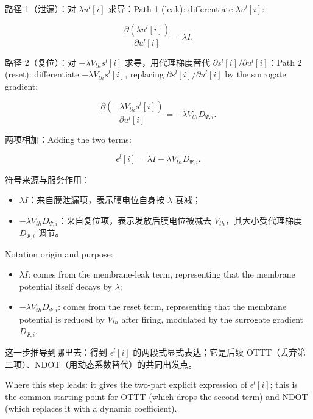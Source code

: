 \documentclass[journal,12pt,onecolumn]{IEEEtran}
\begin{document}
路径 1（泄漏）：对 $\lambda u^l[i]$ 求导：\quad Path 1 (leak): differentiate $\lambda u^l[i]$:

\begin{equation}
\frac{\partial (\lambda u^l[i])}{\partial u^l[i]} = \lambda I.
\end{equation}

路径 2（复位）：对 $-\lambda V_{th} s^l[i]$ 求导，用代理梯度替代 $\partial s^l[i]/\partial u^l[i]$：\quad Path 2 (reset): differentiate $-\lambda V_{th} s^l[i]$, replacing $\partial s^l[i]/\partial u^l[i]$ by the surrogate gradient:

\begin{equation}
\frac{\partial (-\lambda V_{th} s^l[i])}{\partial u^l[i]} = -\lambda V_{th} D_{\Psi,i}.
\end{equation}

两项相加：Adding the two terms:

\begin{equation}
\epsilon^l[i] = \lambda I - \lambda V_{th} D_{\Psi,i}.
\end{equation}

符号来源与服务作用：
\begin{itemize}[leftmargin=1.5em,itemsep=2pt]
\item $\lambda I$：来自膜泄漏项，表示膜电位自身按 $\lambda$ 衰减；
\item $-\lambda V_{th} D_{\Psi,i}$：来自复位项，表示发放后膜电位被减去 $V_{th}$，其大小受代理梯度 $D_{\Psi,i}$ 调节。
\end{itemize}

Notation origin and purpose:
\begin{itemize}[leftmargin=1.5em,itemsep=2pt]
\item $\lambda I$: comes from the membrane-leak term, representing that the membrane potential itself decays by $\lambda$;
\item $-\lambda V_{th} D_{\Psi,i}$: comes from the reset term, representing that the membrane potential is reduced by $V_{th}$ after firing, modulated by the surrogate gradient $D_{\Psi,i}$.
\end{itemize}

这一步推导到哪里去：得到 $\epsilon^l[i]$ 的两段式显式表达；它是后续 OTTT（丢弃第二项）、NDOT（用动态系数替代）的共同出发点。

Where this step leads: it gives the two-part explicit expression of $\epsilon^l[i]$; this is the common starting point for OTTT (which drops the second term) and NDOT (which replaces it with a dynamic coefficient).
\end{document}

